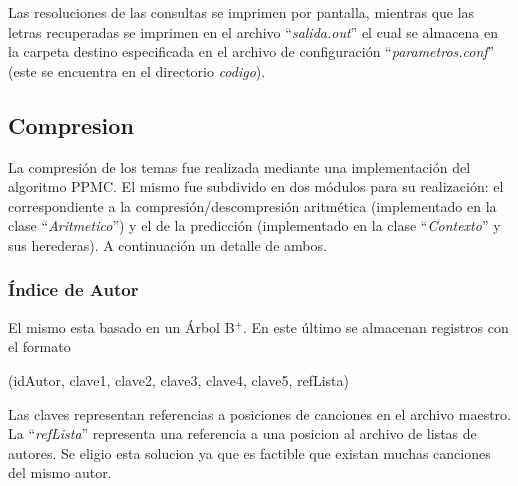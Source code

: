 \documentclass{article}
\begin{document}
	Las resoluciones de las consultas se imprimen por pantalla, mientras que las letras recuperadas se imprimen en el archivo ``\textit{salida.out}'' el cual se almacena en la carpeta destino especificada en el archivo de configuración ``\textit{parametros.conf}'' (este se encuentra en el directorio \textit{codigo}).
\bigskip




\subsection{Compresion}
\medskip

	La compresión de los temas fue realizada mediante una implementación del algoritmo PPMC. El mismo fue subdivido en dos módulos para su realización: el correspondiente a la compresión/descompresión aritmética (implementado en la clase ``\textit{Aritmetico}'') y el de la predicción (implementado en la clase ``\textit{Contexto}'' y sus herederas). A continuación un detalle de ambos.

\bigskip



\subsubsection{Índice de Autor}
\medskip

	El mismo esta basado en un Árbol B$^+$. En este último se almacenan registros con el formato 
	\bigskip

	{\ttfamily\footnotesize
	(idAutor, clave1, clave2, clave3, clave4, clave5, refLista) \\}

	Las claves representan referencias a posiciones de canciones en el archivo maestro. La ``\textit{refLista}'' representa una referencia a una posicion al archivo de listas de autores. Se eligio esta solucion ya que es factible que existan muchas canciones del mismo autor.
\bigskip
\end{document}
